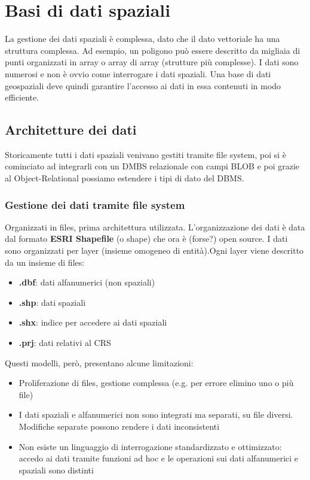 \documentclass[a4paper,12pt]{article}
\begin{document}
\section{Basi di dati spaziali}

La gestione dei dati spaziali è complessa, dato che il dato vettoriale ha una struttura complessa. Ad esempio, un poligono può essere descritto da migliaia di punti organizzati in array o array di array (strutture più complesse). I dati sono numerosi e non è ovvio come interrogare i dati spaziali. Una base di dati geospaziali deve quindi garantire l'accesso ai dati in essa contenuti in modo efficiente.


\subsection{Architetture dei dati}
Storicamente tutti i dati spaziali venivano gestiti tramite file system, poi si è cominciato ad integrarli con un DMBS relazionale con campi BLOB e poi grazie al Object-Relational possiamo estendere i tipi di dato del DBMS.

\subsubsection{Gestione dei dati tramite file system}
Organizzati in files, prima architettura utilizzata. L'organizzazione dei dati è data dal formato \textbf{ESRI Shapefile} (o shape) che ora è (forse?) open source. I dati sono organizzati per layer (insieme omogeneo di entità).Ogni layer viene descritto da un insieme di files:
\begin{itemize}
  \item \textbf{.dbf}: dati alfanumerici (non spaziali)
  \item \textbf{.shp}: dati spaziali
  \item \textbf{.shx}: indice per accedere ai dati spaziali
  \item \textbf{.prj}: dati relativi al CRS
\end{itemize}

Questi modelli, però, presentano alcune limitazioni:
\begin{itemize}
\item Proliferazione di files, gestione complessa (e.g. per errore elimino uno o più file)

\item I dati spaziali e alfanumerici non sono integrati ma separati, su file diversi. Modifiche separate possono rendere i dati inconsistenti

\item Non esiste un linguaggio di interrogazione standardizzato e ottimizzato: accedo ai dati tramite funzioni ad hoc e le operazioni sui dati alfanumerici e spaziali sono distinti
\end{itemize}
\end{document}
